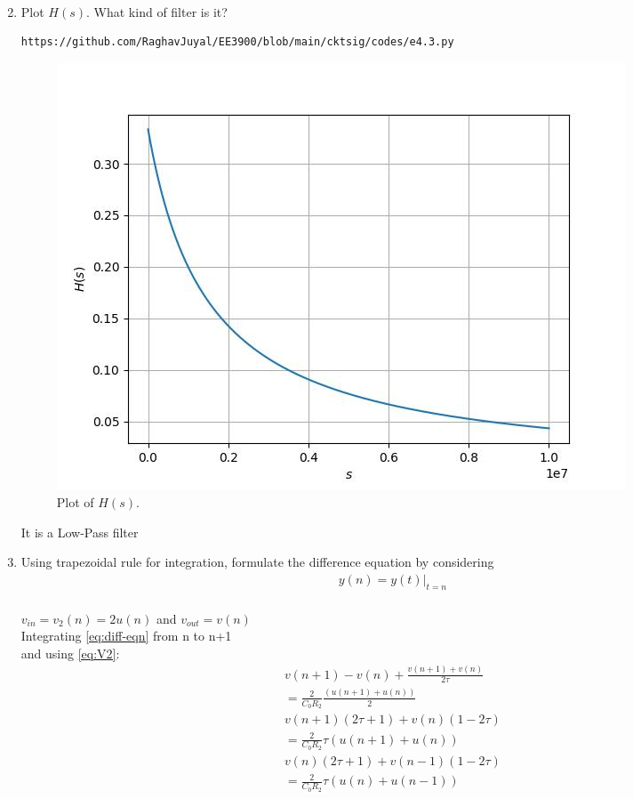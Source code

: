 \documentclass[journal,12pt,twocolumn]{IEEEtran}
\renewcommand\thesection{\arabic{section}}
\begin{document}
\begin{enumerate}[label=\arabic*.,ref=\thesection.\theenumi]
\begin{align}
	\label{eq:Hs}
\end{align}
\item Plot $H(s)$.  What kind of filter is it?\\
\begin{lstlisting}
https://github.com/RaghavJuyal/EE3900/blob/main/cktsig/codes/e4.3.py
\end{lstlisting}
\begin{figure}[!ht]
	\includegraphics[width=\columnwidth]{./figs/e4.3.jpg}
	\caption{Plot of $H(s)$.}
	\label{fig:Hs}
\end{figure}
It is a Low-Pass filter\\
\item Using trapezoidal rule for integration, formulate the difference equation
by considering 
\begin{align}
	y(n) = y(t)\vert_{t=n}
\end{align}
\solution\\
$v_{in} = v_2(n) = 2u(n)$ and $v_{out} = v(n)$\\
Integrating \eqref{eq:diff-eqn} from n to n+1\\ and using \eqref{eq:V2}:
\begin{align}
	v(n+1) - v(n) + \frac{v(n+1) + v(n)}{2\tau} \nonumber\\ = \frac{2}{C_0R_2}\frac{(u(n+1) + u(n))}{2}\\
	v(n+1)(2\tau + 1) + v(n)(1 - 2\tau) \nonumber \\ = \frac{2}{C_0R_2}\tau(u(n+1) + u(n))\\
	v(n)(2\tau + 1) + v(n-1)(1 - 2\tau) \nonumber \\ = \frac{2}{C_0R_2}\tau(u(n) + u(n-1))

\end{align}
\end{enumerate}
\end{document}
